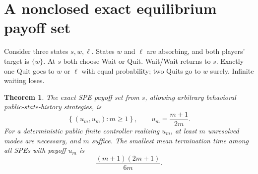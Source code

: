 \documentclass[11pt]{article}
\newtheorem{theorem}{Theorem}
\begin{document}
\section{A nonclosed exact equilibrium payoff set}\label{sec:nonclosed}
Consider three states $s,w,\ell$. States $w$ and $\ell$ are absorbing,
and both players' target is $\{w\}$. At $s$ both choose Wait or Quit.
Wait/Wait returns to $s$. Exactly one Quit goes to $w$ or $\ell$ with
equal probability; two Quits go to $w$ surely. Infinite waiting loses.

\begin{theorem}\label{thm:payoffs}
The exact SPE payoff set from $s$, allowing arbitrary behavioral
public-state-history strategies, is
\begin{equation}\label{eq:set}
 \left\{(u_m,u_m):m\geq1\right\},\qquad u_m=\frac{m+1}{2m}.
\end{equation}
For a deterministic public finite controller realizing $u_m$, at least
$m$ unresolved modes are necessary, and $m$ suffice. The smallest mean
termination time among all SPEs with payoff $u_m$ is
\begin{equation}\label{eq:time}
 \frac{(m+1)(2m+1)}{6m}.
\end{equation}
\end{theorem}
\end{document}
